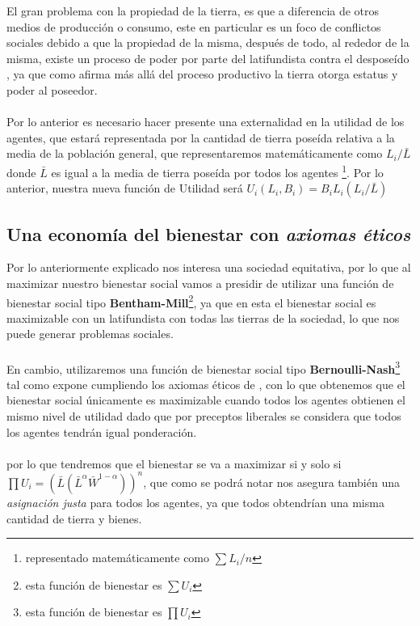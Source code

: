 \documentclass[11pt]{article}
\begin{document}
{\begin{flushleft}
    El gran problema con la propiedad de la tierra, es que a diferencia de otros medios de producción o consumo, este en particular 
    es un foco de conflictos sociales debido a que la propiedad de la misma, después de todo, al rededor de la misma, existe un proceso
    de poder por parte del latifundista contra el desposeído \citep{overbeek_silva_1986}, ya que como afirma \citet{Moyano_Sevilla1978} más allá del proceso 
    productivo la tierra otorga estatus y poder al poseedor.
    \\~\\
    Por lo anterior es necesario hacer presente una externalidad en la utilidad de los agentes, que estará
    representada por la cantidad de tierra poseída relativa a la media de la población general, que representaremos matemáticamente como $L_i/\bar{L}$
    donde $\bar{L}$ es igual a la media de tierra poseída por todos los agentes \footnote{representado matemáticamente como $\sum L_i/n$}. Por lo anterior, nuestra nueva función de Utilidad
    será $U_i(L_i,B_i)=B_iL_i(L_i/\bar{L})$
\end{flushleft}

\subsection{Una economía del bienestar con \textit{axiomas éticos}}

\begin{flushleft}
    Por lo anteriormente explicado nos interesa una sociedad equitativa, por lo que al maximizar nuestro bienestar social vamos a presidir
    de utilizar una función de bienestar social tipo \textbf{Bentham-Mill}\footnote{esta función de bienestar es $\sum U_i$}, ya que en esta el bienestar social es maximizable con un latifundista 
    con todas las tierras de la sociedad, lo que nos puede generar problemas sociales. 
    \\~\\
    En cambio, utilizaremos una función de bienestar social tipo \textbf{Bernoulli-Nash}\footnote{esta función de bienestar es $\prod U_i$}
    tal como expone \citet{nash_1950} cumpliendo los axiomas éticos de \citet{nash_1953}, con lo que obtenemos que el bienestar social únicamente es maximizable
    cuando todos los agentes obtienen el mismo nivel de utilidad dado que por preceptos liberales se considera que todos los agentes tendrán igual ponderación.
    \\~\\
    por lo que tendremos que el bienestar se va a maximizar si y solo si $\prod U_i = (\bar{L}(\bar{L}^\alpha \bar{W}^{1-\alpha}))^n$, que como se podrá notar nos asegura también una \textit{asignación justa}
    para todos los agentes, ya que todos obtendrían una misma cantidad de tierra y bienes.
\end{flushleft}

}
\end{document}
